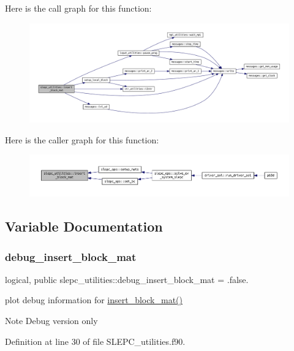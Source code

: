 Here is the call graph for this function\+:\nopagebreak
\begin{figure}[H]
\begin{center}
\leavevmode
\includegraphics[width=350pt]{namespaceslepc__utilities_aa34aa361f0bfff9621ecba179f9ed0c6_cgraph}
\end{center}
\end{figure}
Here is the caller graph for this function\+:\nopagebreak
\begin{figure}[H]
\begin{center}
\leavevmode
\includegraphics[width=350pt]{namespaceslepc__utilities_aa34aa361f0bfff9621ecba179f9ed0c6_icgraph}
\end{center}
\end{figure}


\subsection{Variable Documentation}
\mbox{\label{namespaceslepc__utilities_a5cb92553633cb22ff703286298862ac7}} 
\subsubsection{\texorpdfstring{debug\+\_\+insert\+\_\+block\+\_\+mat}{debug\_insert\_block\_mat}}
{\footnotesize\ttfamily logical, public slepc\+\_\+utilities\+::debug\+\_\+insert\+\_\+block\+\_\+mat = .false.}



plot debug information for \hyperlink{namespaceslepc__utilities_aa34aa361f0bfff9621ecba179f9ed0c6}{insert\+\_\+block\+\_\+mat()} 

\begin{DoxyNote}{Note}
Debug version only 
\end{DoxyNote}


Definition at line 30 of file S\+L\+E\+P\+C\+\_\+utilities.\+f90.

